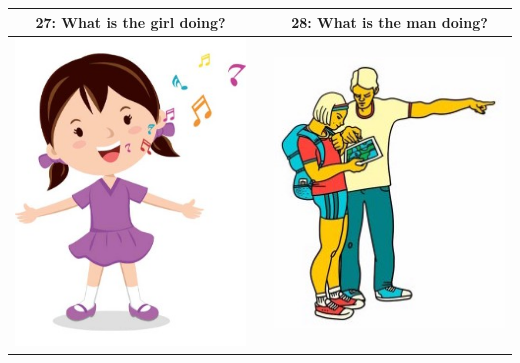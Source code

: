 \documentclass[12pt,notitlepage]{article}
\begin{document}
\begin{center}
\begin{tabular}{|c|c|c|}
\hline
27: What is the girl doing? && 28: What is the man doing? \\
\hline
\includegraphics[width=20em,trim=0 0 0 -3]{figures/I27.jpg} & & \includegraphics[width=20em,trim=0 0 0 -3]{figures/I28.jpg} \\
\hline
\end{tabular}
\vspace{1em} \\



\end{center}
\end{document}
